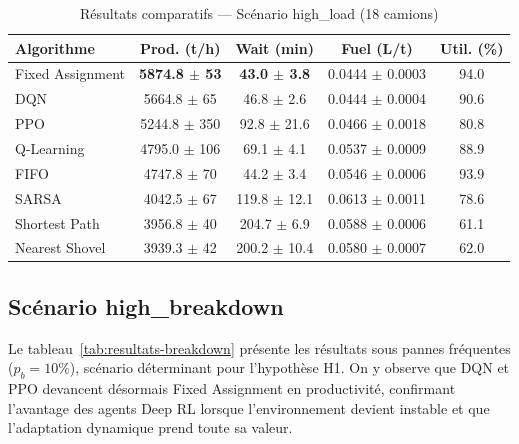\documentclass[11pt,a4paper]{report}
\begin{document}
\begin{table}[H]
\centering
\caption{Résultats comparatifs — Scénario high\_load (18 camions)}
\label{tab:resultats-highload}
\begin{tabular}{lcccc}
\toprule
\textbf{Algorithme} & \textbf{Prod. (t/h)} & \textbf{Wait (min)} & \textbf{Fuel (L/t)} & \textbf{Util. (\%)} \\
\midrule
Fixed Assignment & \textbf{5874.8 $\pm$ 53} & \textbf{43.0 $\pm$ 3.8}
    & 0.0444 $\pm$ 0.0003 & 94.0 \\
DQN              & 5664.8 $\pm$ 65 & 46.8 $\pm$ 2.6
    & 0.0444 $\pm$ 0.0004 & 90.6 \\
PPO              & 5244.8 $\pm$ 350 & 92.8 $\pm$ 21.6
    & 0.0466 $\pm$ 0.0018 & 80.8 \\
Q-Learning       & 4795.0 $\pm$ 106 & 69.1 $\pm$ 4.1
    & 0.0537 $\pm$ 0.0009 & 88.9 \\
FIFO             & 4747.8 $\pm$ 70 & 44.2 $\pm$ 3.4
    & 0.0546 $\pm$ 0.0006 & 93.9 \\
SARSA            & 4042.5 $\pm$ 67 & 119.8 $\pm$ 12.1
    & 0.0613 $\pm$ 0.0011 & 78.6 \\
Shortest Path    & 3956.8 $\pm$ 40 & 204.7 $\pm$ 6.9
    & 0.0588 $\pm$ 0.0006 & 61.1 \\
Nearest Shovel   & 3939.3 $\pm$ 42 & 200.2 $\pm$ 10.4
    & 0.0580 $\pm$ 0.0007 & 62.0 \\
\bottomrule
\end{tabular}
\end{table}

\subsection{Scénario high\_breakdown}

Le tableau~\ref{tab:resultats-breakdown} pr\'esente les r\'esultats sous pannes fr\'equentes ($p_b = 10\%$), sc\'enario d\'eterminant pour l'hypoth\`ese H1. On y observe que DQN et PPO devancent d\'esormais Fixed Assignment en productivit\'e, confirmant l'avantage des agents Deep RL lorsque l'environnement devient instable et que l'adaptation dynamique prend toute sa valeur.
\end{document}
